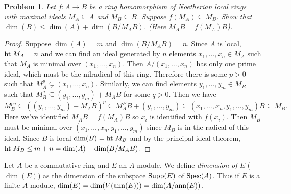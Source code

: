 \documentclass{article}
\newcommand{\ann}{\textup{ann}}
\newcommand{\spec}{\textup{Spec}}
\newcommand{\Ht}{\textup{ht}\;}
\newcommand{\supp}{\textup{Supp}}
\newtheorem{problem}{Problem}
\begin{document}
\begin{problem}
Let $f : A \to B$ be a ring homomorphism of Noetherian local rings with maximal ideals $M_A \subseteq A$ and $M_B \subseteq B$. Suppose $f(M_A) \subseteq M_B$. Show that $\dim(B) \leq \dim(A) + \dim(B/M_AB)$. (Here $M_AB = f(M_A)B$).
\end{problem}
\begin{proof}
Suppose $\dim(A) = m$ and $\dim(B/M_AB) = n$. Since $A$ is local, $\Ht M_A = n$ and we can find an ideal generated by $n$ elements $x_1, \dots , x_n \in M_A$ such that $M_A$ is minimal over $(x_1, \dots , x_n)$. Then $A/(x_1, \dots , x_n)$ has only one prime ideal, which must be the nilradical of this ring. Therefore there is some $p > 0$ such that $M_A^p \subsetneq (x_1, \dots , x_n)$. Similarly, we can find elements $y_1, \dots , y_m \in M_B$ such that $M_B^q \subseteq (y_1, \dots , y_m) + M_AB$ for some $q > 0$. Then we have
\[
M_B^{pq} \subseteq ((y_1, \dots , y_m) + M_AB)^p \subseteq M_A^PB + (y_1, \dots , y_m) \subseteq (x_1, \dots , x_n, y_1, \dots , y_m)B \subseteq M_B.
\]
Here we've identified $M_AB = f(M_A)B$ so $x_i$ is identified with $f(x_i)$. Then $M_B$ must be minimal over $(x_1, \dots , x_n, y_1, \dots , y_m)$ since $M_B$ is in the radical of this ideal. Since $B$ is local $\dim(B) = \Ht M_B$ and by the principal ideal theorem, $\Ht M_B \leq m + n = \dim(A) + \dim(B/M_AB)$.
\end{proof}

\noindent
Let $A$ be a commutative ring and $E$ an $A$-module. We define \emph{dimension of $E$} ($\dim(E)$) as the dimension of the subspace $\supp(E)$ of $\spec(A)$. Thus if $E$ is a finite $A$-module, $\dim(E) = \dim(V(\ann(E))) = \dim(A/\ann(E))$.
\end{document}
